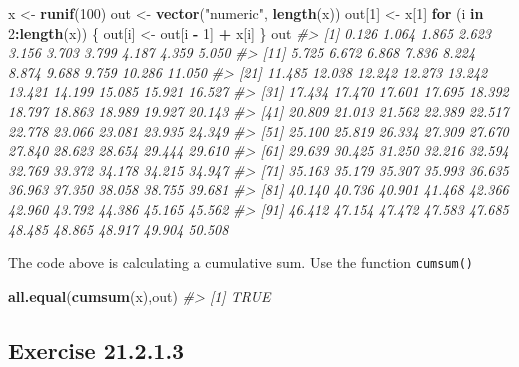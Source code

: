 \documentclass[]{book}
\newenvironment{Shaded}{\begin{snugshade}}{\end{snugshade}}
\newcommand{\CommentTok}[1]{\textcolor[rgb]{0.56,0.35,0.01}{\textit{#1}}}
\newcommand{\ControlFlowTok}[1]{\textcolor[rgb]{0.13,0.29,0.53}{\textbf{#1}}}
\newcommand{\DecValTok}[1]{\textcolor[rgb]{0.00,0.00,0.81}{#1}}
\newcommand{\KeywordTok}[1]{\textcolor[rgb]{0.13,0.29,0.53}{\textbf{#1}}}
\newcommand{\NormalTok}[1]{#1}
\newcommand{\OperatorTok}[1]{\textcolor[rgb]{0.81,0.36,0.00}{\textbf{#1}}}
\newcommand{\StringTok}[1]{\textcolor[rgb]{0.31,0.60,0.02}{#1}}
\theoremstyle{plain}
\theoremstyle{remark}
\begin{document}
\begin{Shaded}
\begin{Highlighting}[]
\NormalTok{x <-}\StringTok{ }\KeywordTok{runif}\NormalTok{(}\DecValTok{100}\NormalTok{)}
\NormalTok{out <-}\StringTok{ }\KeywordTok{vector}\NormalTok{(}\StringTok{"numeric"}\NormalTok{, }\KeywordTok{length}\NormalTok{(x))}
\NormalTok{out[}\DecValTok{1}\NormalTok{] <-}\StringTok{ }\NormalTok{x[}\DecValTok{1}\NormalTok{]}
\ControlFlowTok{for}\NormalTok{ (i }\ControlFlowTok{in} \DecValTok{2}\OperatorTok{:}\KeywordTok{length}\NormalTok{(x)) \{}
\NormalTok{  out[i] <-}\StringTok{ }\NormalTok{out[i }\OperatorTok{-}\StringTok{ }\DecValTok{1}\NormalTok{] }\OperatorTok{+}\StringTok{ }\NormalTok{x[i]}
\NormalTok{\}}
\NormalTok{out}
\CommentTok{#>   [1]  0.126  1.064  1.865  2.623  3.156  3.703  3.799  4.187  4.359  5.050}
\CommentTok{#>  [11]  5.725  6.672  6.868  7.836  8.224  8.874  9.688  9.759 10.286 11.050}
\CommentTok{#>  [21] 11.485 12.038 12.242 12.273 13.242 13.421 14.199 15.085 15.921 16.527}
\CommentTok{#>  [31] 17.434 17.470 17.601 17.695 18.392 18.797 18.863 18.989 19.927 20.143}
\CommentTok{#>  [41] 20.809 21.013 21.562 22.389 22.517 22.778 23.066 23.081 23.935 24.349}
\CommentTok{#>  [51] 25.100 25.819 26.334 27.309 27.670 27.840 28.623 28.654 29.444 29.610}
\CommentTok{#>  [61] 29.639 30.425 31.250 32.216 32.594 32.769 33.372 34.178 34.215 34.947}
\CommentTok{#>  [71] 35.163 35.179 35.307 35.993 36.635 36.963 37.350 38.058 38.755 39.681}
\CommentTok{#>  [81] 40.140 40.736 40.901 41.468 42.366 42.960 43.792 44.386 45.165 45.562}
\CommentTok{#>  [91] 46.412 47.154 47.472 47.583 47.685 48.485 48.865 48.917 49.904 50.508}
\end{Highlighting}
\end{Shaded}

The code above is calculating a cumulative sum. Use the function
\texttt{cumsum()}

\begin{Shaded}
\begin{Highlighting}[]
\KeywordTok{all.equal}\NormalTok{(}\KeywordTok{cumsum}\NormalTok{(x),out)}
\CommentTok{#> [1] TRUE}
\end{Highlighting}
\end{Shaded}

\hypertarget{exercise-21.2.1.3}{%
\subsection*{\texorpdfstring{Exercise
{21.2.1.3}}{Exercise 21.2.1.3}}\label{exercise-21.2.1.3}}
\end{document}
